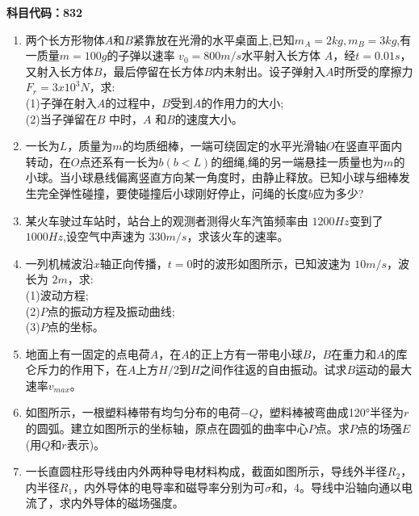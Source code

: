 \textbf{科目代码：832}
\begin{enumerate}
\item 两个长方形物体$A$和$B$紧靠放在光滑的水平桌面上,已知$m_A=2kg,m_B=3kg$,有一质量$ m=100g$的子弹以速率 $v_0=800m/s$水平射入长方体 $A$，经$t=0.01s$，又射入长方体$B$，最后停留在长方体$B$内未射出。设子弹射入$A$时所受的摩擦力$F_r=3x10^3N$，求:\\
(1)子弹在射入$A$的过程中，$B $受到$A$的作用力的大小;\\
(2)当子弹留在$ B$ 中时，$A$ 和$B$的速度大小。
\item 一长为$L$，质量为$m$的均质细棒，一端可绕固定的水平光滑轴$O$在竖直平面内转动，在$O$点还系有一长为$b(b<L)$的细绳,绳的另一端悬挂一质量也为$m$的小球。当小球悬线偏离竖直方向某一角度时，由静止释放。已知小球与细棒发生完全弹性碰撞，要使碰撞后小球刚好停止，问绳的长度$b$应为多少?
\item 某火车驶过车站时，站台上的观测者测得火车汽笛频率由 $1200Hz$变到了 $1000 Hz$,设空气中声速为 $330m/s$，求该火车的速率。
\item 一列机械波沿$x$轴正向传播，$t=0$时的波形如图所示，已知波速为 $10m/s$，波长为 $2m$，求:\\
(1)波动方程;\\
(2)$P$点的振动方程及振动曲线;\\
(3)$P $点的坐标。
\item 地面上有一固定的点电荷$ A$，在$A$的正上方有一带电小球$B$，$B$在重力和$A$的库仑斥力的作用下，在$A$上方$ H/2 $到$H$之间作往返的自由振动。试求$B$运动的最大速率$v_{max}$。
\item  如图所示，一根塑料棒带有均匀分布的电荷$-Q$，塑料棒被弯曲成120°半径为$r$的圆弧。建立如图所示的坐标轴，原点在圆弧的曲率中心$P$点。求$P$点的场强$E$(用$Q$和$r$表示)。
\item 一长直圆柱形导线由内外两种导电材料构成，截面如图所示，导线外半径$R_2$，内半径$R_1$，内外导体的电导率和磁导率分别为可$\sigma$和，4。导线中沿轴向通以电流了，求内外导体的磁场强度。
\end{enumerate}
